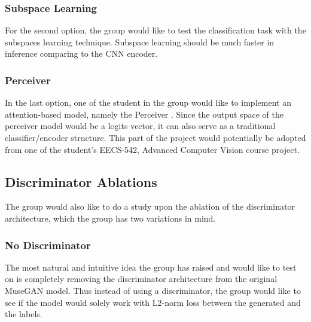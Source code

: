 \begin{par}

        \subsubsection{Subspace Learning} %
        \label{ssub:Subspace Learning}
            \par \hspace{15pt}  For the second option, the group would like to test the classification task with the subspaces learning technique. Subspace learning should be much faster in inference comparing to the CNN encoder. 

        \subsubsection{Perceiver} %
        \label{ssub:Perceiver}
            \par \hspace{15pt}  In the last option, one of the student in the group would like to implement an attention-based model, namely the Perceiver \cite{perceiver}. Since the output space of the perceiver model would be a logits vector, it can also serve as a traditional classifier/encoder structure. This part of the project would potentially be adopted from one of the student's EECS-542, Advanced Computer Vision course project. 

    \subsection{Discriminator Ablations} %
    \label{sub:Discriminator Ablations}
        \par \hspace{15pt}  The group would also like to do a study upon the ablation of the discriminator architecture, which the group has two variations in mind. 

        \subsubsection{No Discriminator} %
        \label{ssub:No Discriminator}
            \par \hspace{15pt} The most natural and intuitive idea the group has raised and would like to test on is completely removing the discriminator architecture from the original MuseGAN model. Thus instead of using a discriminator, the group would like to see if the model would solely work with L2-norm loss between the generated and the labels.
            


\end{par}
